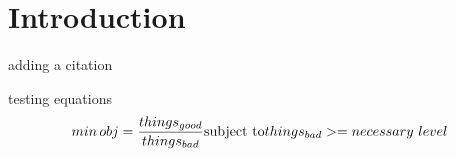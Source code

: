 \section{Introduction}

adding a citation \cite{Pouransari_2014}

testing equations
\begin{equation}
min \, obj= \frac{things_{good}}{things_{bad}} \\
\text{subject to}  \\
things_{bad}>=necessary\,\, level
\end{equation}